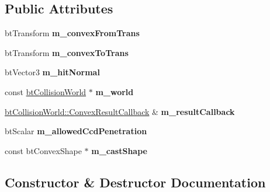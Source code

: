 \subsection*{Public Attributes}
\begin{DoxyCompactItemize}
\item 
\mbox{\label{structbtSingleSweepCallback_a69b93f7fc3793e8984609295dc43346f}} 
bt\+Transform {\bfseries m\+\_\+convex\+From\+Trans}
\item 
\mbox{\label{structbtSingleSweepCallback_a31ab25b89b90fa8157d51f504a677640}} 
bt\+Transform {\bfseries m\+\_\+convex\+To\+Trans}
\item 
\mbox{\label{structbtSingleSweepCallback_a053037e4988f03348ce30f346bd60c64}} 
bt\+Vector3 {\bfseries m\+\_\+hit\+Normal}
\item 
\mbox{\label{structbtSingleSweepCallback_a38fbca89a6243c28912a6735437cea1f}} 
const \hyperlink{classbtCollisionWorld}{bt\+Collision\+World} $\ast$ {\bfseries m\+\_\+world}
\item 
\mbox{\label{structbtSingleSweepCallback_abfbd3ec3f7292c7afaa86bd9429b2de5}} 
\hyperlink{structbtCollisionWorld_1_1ConvexResultCallback}{bt\+Collision\+World\+::\+Convex\+Result\+Callback} \& {\bfseries m\+\_\+result\+Callback}
\item 
\mbox{\label{structbtSingleSweepCallback_ad4ed47b5940335cdf0b061a2d0226ef1}} 
bt\+Scalar {\bfseries m\+\_\+allowed\+Ccd\+Penetration}
\item 
\mbox{\label{structbtSingleSweepCallback_a0bae8a399ab777f107a6b62e6ba0a85a}} 
const bt\+Convex\+Shape $\ast$ {\bfseries m\+\_\+cast\+Shape}
\end{DoxyCompactItemize}


\subsection{Constructor \& Destructor Documentation}
\mbox{\label{structbtSingleSweepCallback_adb99242209085f3562005a5a0c088793}} 
